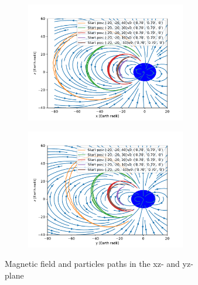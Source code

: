 \documentclass{article}
\begin{document}
\begin{figure}[h]
    \begin{subfigure}{0.66\textwidth}
        \begin{subfigure}{0.5\textwidth}
            \includegraphics[width=\linewidth]{./media/xz-plane.pdf}
        \end{subfigure}
        \begin{subfigure}{0.5\textwidth}
            \includegraphics[width=\linewidth]{./media/yz-plane.pdf}
        \end{subfigure}
        \caption{Magnetic field and particles paths in the xz- and yz-plane}
        \label{paths}
    \end{subfigure}
    \begin{subfigure}{0.33\textwidth}

\end{subfigure}
\end{figure}
\end{document}
